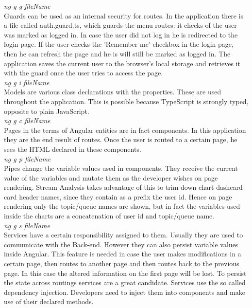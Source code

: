 \textit{ng g g fileName}\\

Guards can be used as an internal security for routes. In the application there is a file called auth.guard.ts, which guards the menu routes: it checks of the user was marked as logged in. In case the user did not log in he is redirected to the login page. If the user checks the 'Remember me' checkbox in the login page, then he can refresh the page and he is will still be marked as logged in. The application saves the current user to the browser's local storage and retrieves it with the guard once the user tries to access the page.\\

\textit{ng g i fileName}\\

Models are various class declarations with the properties. These are used throughout the application. This is possible because TypeScript is strongly typed, opposite to plain JavaScript.\\

\textit{ng g c fileName}\\

Pages in the terms of Angular entities are in fact components. In this application they are the end result of routes. Once the user is routed to a certain page, he sees the HTML declared in these components.\\

\textit{ng g p fileName}\\

Pipes change the variable values used in components. They receive the current value of the variables and mutate them as the developer wishes on page rendering. Stream Analysis takes advantage of this to trim down chart dashcard card header names, since they contain as a prefix the user id. Hence on page rendering only the topic/queue names are shown, but in fact the variables used inside the charts are a concatenation of user id and topic/queue name.\\

\textit{ng g s fileName}\\

Services have a certain responsibility assigned to them. Usually they are used to communicate with the Back-end. However they can also persist variable values inside Angular. This feature is needed in case the user makes modifications in a certain page, then routes to another page and then routes back to the previous page. In this case the altered information on the first page will be lost. To persist the state across routings services are a great candidate.
Services use the so called dependency injection. Developers need to inject them into components and make use of their declared methods.

